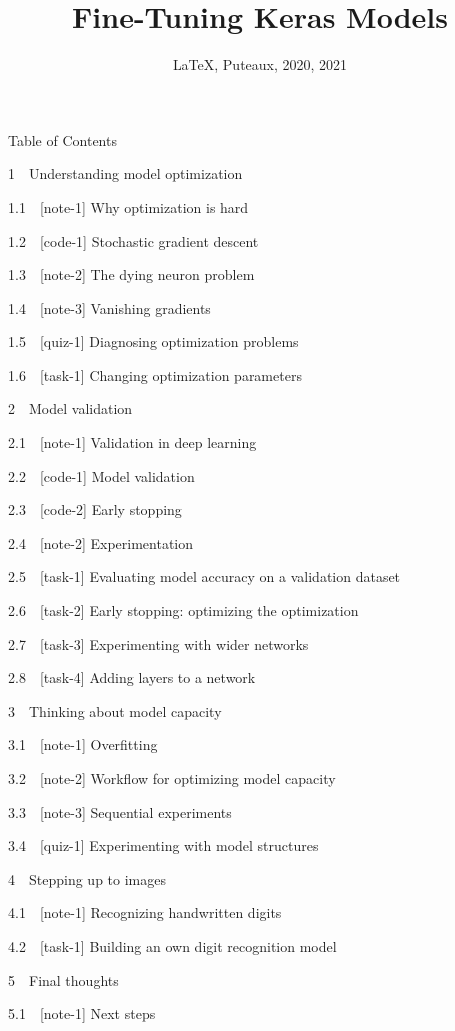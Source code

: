 \documentclass[11pt, twoside]{article}
\date{\LaTeX, Puteaux, 2020, 2021}
\title{Fine-Tuning Keras Models}
\begin{document}
    
    \maketitle
    
    

    
    Table of Contents{}

{{1~~}Understanding model optimization}

{{1.1~~}{[}note-1{]} Why optimization is hard}

{{1.2~~}{[}code-1{]} Stochastic gradient descent}

{{1.3~~}{[}note-2{]} The dying neuron problem}

{{1.4~~}{[}note-3{]} Vanishing gradients}

{{1.5~~}{[}quiz-1{]} Diagnosing optimization problems}

{{1.6~~}{[}task-1{]} Changing optimization parameters}

{{2~~}Model validation}

{{2.1~~}{[}note-1{]} Validation in deep learning}

{{2.2~~}{[}code-1{]} Model validation}

{{2.3~~}{[}code-2{]} Early stopping}

{{2.4~~}{[}note-2{]} Experimentation}

{{2.5~~}{[}task-1{]} Evaluating model accuracy on a validation dataset}

{{2.6~~}{[}task-2{]} Early stopping: optimizing the optimization}

{{2.7~~}{[}task-3{]} Experimenting with wider networks}

{{2.8~~}{[}task-4{]} Adding layers to a network}

{{3~~}Thinking about model capacity}

{{3.1~~}{[}note-1{]} Overfitting}

{{3.2~~}{[}note-2{]} Workflow for optimizing model capacity}

{{3.3~~}{[}note-3{]} Sequential experiments}

{{3.4~~}{[}quiz-1{]} Experimenting with model structures}

{{4~~}Stepping up to images}

{{4.1~~}{[}note-1{]} Recognizing handwritten digits}

{{4.2~~}{[}task-1{]} Building an own digit recognition model}

{{5~~}Final thoughts}

{{5.1~~}{[}note-1{]} Next steps}
\end{document}
